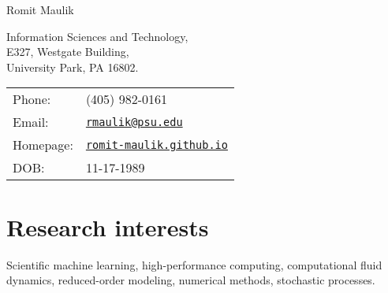 \documentclass[letterpaper]{article}
\def\name{Romit Maulik}
\begin{document}
{\huge \name}


\vspace{0.25in}

\begin{minipage}{0.45\linewidth}
  Information Sciences and Technology, \\
  E327, Westgate Building, \\
  University Park, PA 16802.
\end{minipage}
\begin{minipage}{0.45\linewidth}
  \begin{tabular}{ll}
    Phone: & (405) 982-0161 \\
    Email: & \href{mailto:rmaulik@psu.edu}{\tt rmaulik@psu.edu} \\
    Homepage: & \href{https://romit-maulik.github.io/}{\tt romit-maulik.github.io} \\
    DOB: & 11-17-1989
  \end{tabular}
\end{minipage}

\section*{Research interests}

Scientific machine learning,  high-performance computing, computational fluid dynamics, reduced-order modeling, numerical methods, stochastic processes.
\end{document}
